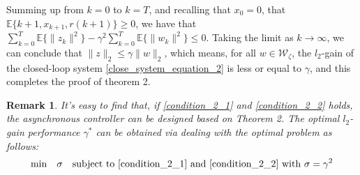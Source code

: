 \documentclass[conference]{IEEEtran}
\newtheorem{remark}{Remark}
\begin{document}
Summing up from $k=0$ to $k=T$, and recalling that $x_{0} =0$, that $\mathbb{E}\{k+1,x_{k+1},r(k+1)\}\geq0 $, we have that $\sum_{k=0}^{T}\mathbb{E}\{ \|z_{k}\|^{2} \}-\gamma^{2}\sum_{k=0}^{T}\mathbb{E}\{\|w_{k}\|^{2}\}\leq0 $. Taking the limit as $k\to \infty$, we can conclude that $\|z\|_{2}\leq\gamma\|w\|_{2}$, which means, for all $w\in \mathcal{W}_{\zeta}$, the $l_{2}$-gain of the closed-loop system \eqref{close_system_equation_2} is less or equal to $\gamma$, and this completes the proof of theorem 2.
\begin{remark}
	It's easy to find that, if \eqref{condition_2_1} and \eqref{condition_2_2} holds, the asynchronous controller can be designed based on Theorem 2. The optimal $l_2$-gain performance $\gamma^{*}$ can be obtained via dealing with the optimal problem as follows: 
	\begin{equation} \label{min_gamma_index}
	\mathrm{min}\quad \sigma \quad \mathrm{subject \ to} \ \eqref{condition_2_1} \ \mathrm{and} \ \eqref{condition_2_2} \ \mathrm{with} \ \sigma=\gamma^{2} 
	\end{equation}
\end{remark}
\end{document}
